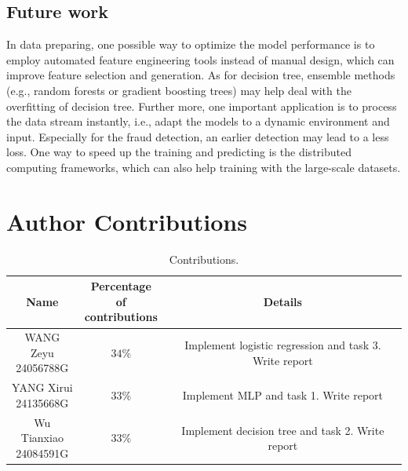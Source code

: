 \documentclass[11pt]{article}
\renewcommand\thesection{\arabic{section}}
\begin{document}
\subsection{Future work}

In data preparing, one possible way to optimize the model performance is to employ automated feature engineering tools instead of manual design, which can improve feature selection and generation. As for decision tree, ensemble methods (e.g., random forests or gradient boosting trees) may help deal with the overfitting of decision tree. Further more, one important application is to process the data stream instantly, i.e., adapt the models to a dynamic environment and input. Especially for the fraud detection, an earlier detection may lead to a less loss. One way to speed up the training and predicting is the distributed computing frameworks, which can also help training with the large-scale datasets.

\newpage




\newpage

\appendix
\renewcommand\thesection{\Alph{section}}

\section{Author Contributions}

\begin{table}[H]
  \centering
  \begin{tabular}{|c|c|c|}
    \hline
    Name & \makecell{Percentage of \\ contributions} & Details \\
    \hline
    \makecell{WANG Zeyu            \\ 24056788G}   &        $34\%$                 & Implement logistic regression and task 3. Write report\\
    \hline
    \makecell{YANG Xirui           \\ 24135668G}  &               $33\%$          &Implement MLP and task 1. Write report \\
    \hline
    \makecell{Wu Tianxiao          \\ 24084591G} &                      $33\%$   & Implement decision tree and task 2. Write report\\
    \hline
  \end{tabular}
  \caption{Contributions.}
\end{table}
\end{document}
